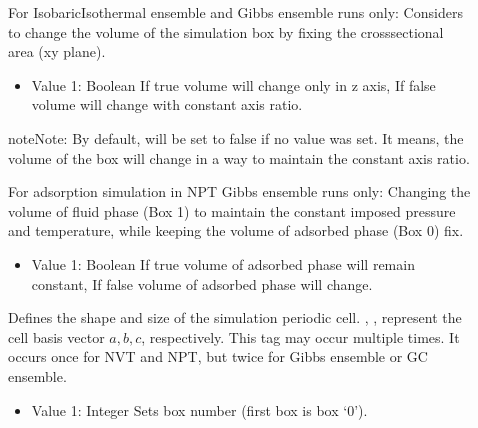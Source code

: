 \documentclass[letterpaper,10pt,english]{sphinxmanual}
\begin{document}
\begin{description}
\item[{}] \leavevmode
\sphinxAtStartPar
For Isobaric\sphinxhyphen{}Isothermal ensemble and Gibbs ensemble runs only: Considers to change the volume of the simulation box by fixing the cross\sphinxhyphen{}sectional area (x\sphinxhyphen{}y plane).
\begin{itemize}
\item {} 
\sphinxAtStartPar
Value 1: Boolean \sphinxhyphen{} If true volume will change only in z axis, If false volume will change with constant axis ratio.

\end{itemize}

\begin{sphinxadmonition}{note}{Note:}
\sphinxAtStartPar
By default,  will be set to false if no value was set. It means, the volume of the box will change in a way to maintain the constant axis ratio.
\end{sphinxadmonition}

\item[{}] \leavevmode
\sphinxAtStartPar
For adsorption simulation in NPT Gibbs ensemble runs only: Changing the volume of fluid phase (Box 1) to maintain the constant imposed pressure and temperature, while keeping the volume of adsorbed phase (Box 0) fix.
\begin{itemize}
\item {} 
\sphinxAtStartPar
Value 1: Boolean \sphinxhyphen{} If true volume of adsorbed phase will remain constant, If false volume of adsorbed phase will change.

\end{itemize}

\item[{}] \leavevmode
\sphinxAtStartPar
Defines the shape and size of the simulation periodic cell. , ,  represent the cell basis vector \(a,b,c\), respectively. This tag may occur multiple times. It occurs once for NVT and NPT, but twice for Gibbs ensemble or GC ensemble.
\begin{itemize}
\item {} 
\sphinxAtStartPar
Value 1: Integer \sphinxhyphen{} Sets box number (first box is box ‘0’).


\end{itemize}
\end{description}
\end{document}
